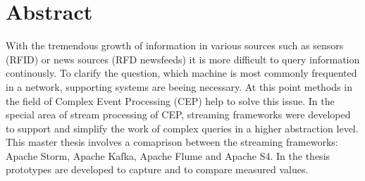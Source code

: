 

\section*{Abstract}
With the tremendous growth of information in various sources such as sensors (RFID) or news sources (RFD newsfeeds)
it is more difficult to query information continously. To clarify the question, which machine is most commonly frequented in a network, supporting systems are beeing necessary. At this point methods in the field of Complex Event Processing (CEP) help to solve this issue. In the special area of stream processing of CEP, streaming frameworks were developed to support and simplify the work of complex queries in a higher abstraction level. This master thesis involves a comaprison between the streaming frameworks: Apache Storm, Apache Kafka, Apache Flume and Apache S4. In the thesis prototypes are developed to capture and to compare measured values.

